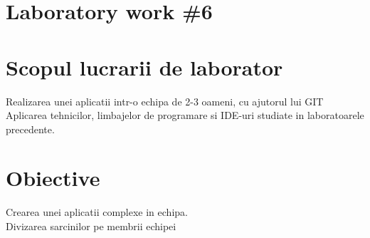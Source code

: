 \section*{Laboratory work \#6}

\section{Scopul lucrarii de laborator}
Realizarea unei aplicatii intr-o echipa de 2-3 oameni, cu ajutorul lui GIT\\
Aplicarea tehnicilor, limbajelor de programare si IDE-uri studiate in laboratoarele precedente.
\section{Obiective}

Crearea unei aplicatii complexe in echipa.\\
Divizarea sarcinilor pe membrii echipei

\clearpage